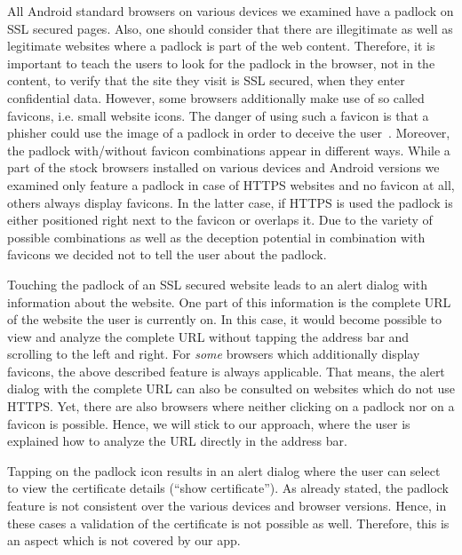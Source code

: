 \begin{description}[leftmargin=0cm]
		\item[HTTPS Padlock] All Android standard browsers on various devices we examined have a padlock on SSL secured pages.
Also, one should consider that there are illegitimate as well as legitimate websites where a padlock is part of the web content. 
Therefore, it is important to teach the users to look for the padlock in the browser, not in the content, to verify that the site they visit is SSL secured, when they enter confidential data.
However, some browsers additionally make use of so called favicons, i.e. small website icons.
The danger of using such a favicon is that a phisher could use the image of a padlock in order to deceive the user~\cite{trusteer2011}.
Moreover, the padlock with/without favicon combinations appear in different ways. 
While a part of the stock browsers installed on various devices and Android versions we examined only feature a padlock in case of HTTPS websites and no favicon at all, others always display favicons. 
In the latter case, if HTTPS is used the padlock is either positioned right next to the favicon or overlaps it.
Due to the variety of possible combinations as well as the deception potential in combination with favicons we decided not to tell the user about the padlock.
		\item[Touch Padlock] Touching the padlock of an SSL secured website leads to an alert dialog with information about the website. 
One part of this information is the complete URL of the website the user is currently on.
In this case, it would become possible to view and analyze the complete URL without tapping the address bar and scrolling to the left and right.
For \textit{some} browsers which additionally display favicons, the above described feature is always applicable.
That means, the alert dialog with the complete URL can also be consulted on websites which do not use HTTPS.
Yet, there are also browsers where neither clicking on a padlock nor on a favicon is possible.
Hence, we will stick to our approach, where the user is explained how to analyze the URL directly in the address bar.
		\item[Certificate Verification]Tapping on the padlock icon results in an alert dialog where the user can select to view the certificate details (``show certificate'').
As already stated, the padlock feature is not consistent over the various devices and browser versions.
Hence, in these cases a validation of the certificate is not possible as well.
Therefore, this is an aspect which is not covered by our app.

\end{description}

